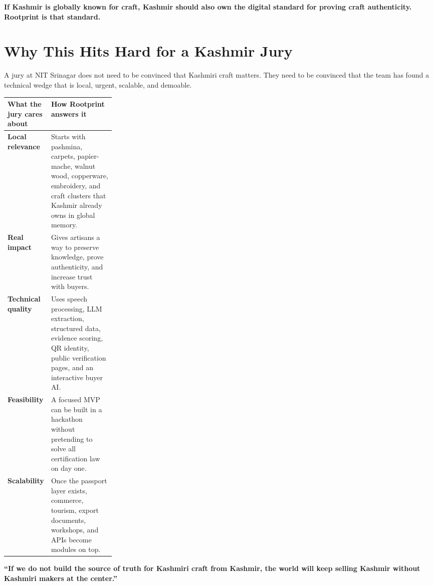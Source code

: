 \documentclass[11pt,a4paper]{article}
\begin{document}
\begin{goldbox}
\textbf{If Kashmir is globally known for craft, Kashmir should also own the digital standard for proving craft authenticity. Rootprint is that standard.}
\end{goldbox}

\section{Why This Hits Hard for a Kashmir Jury}

A jury at NIT Srinagar does not need to be convinced that Kashmiri craft matters. They need to be convinced that the team has found a technical wedge that is local, urgent, scalable, and demoable.

\begin{center}
\begin{tabularx}{\linewidth}{>{\bfseries}p{0.25\linewidth}X}
\toprule
What the jury cares about & How Rootprint answers it \\
\midrule
Local relevance & Starts with pashmina, carpets, papier-mache, walnut wood, copperware, embroidery, and craft clusters that Kashmir already owns in global memory. \\
Real impact & Gives artisans a way to preserve knowledge, prove authenticity, and increase trust with buyers. \\
Technical quality & Uses speech processing, LLM extraction, structured data, evidence scoring, QR identity, public verification pages, and an interactive buyer AI. \\
Feasibility & A focused MVP can be built in a hackathon without pretending to solve all certification law on day one. \\
Scalability & Once the passport layer exists, commerce, tourism, export documents, workshops, and APIs become modules on top. \\
\bottomrule
\end{tabularx}
\end{center}

\begin{blackbox}
\textbf{``If we do not build the source of truth for Kashmiri craft from Kashmir, the world will keep selling Kashmir without Kashmiri makers at the center.''}
\end{blackbox}
\end{document}
